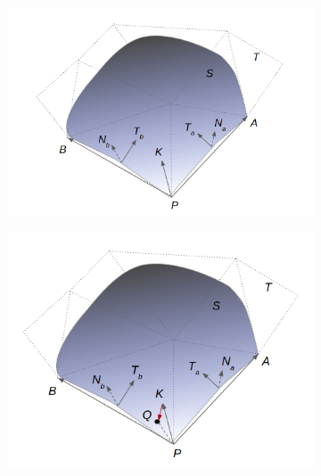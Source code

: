 \begin{figure}
\centering
\begin{subfigure}{0.5\textwidth}
  \centering
  \includegraphics[trim={2cm 0 2cm 0},clip,width=\linewidth]{img/m1/pointPlacement.png}
  \caption{}
  \label{fig-pointPlacement1}
\end{subfigure}%
\begin{subfigure}{0.5\textwidth}
  \centering
  \includegraphics[width=\linewidth]{img/m1/pointProjection.png}
  \caption{}
  \label{fig-pointPlacement2}
\end{subfigure}
\begin{subfigure}{0.5\textwidth}
	\centering

\end{subfigure}
\end{figure}
